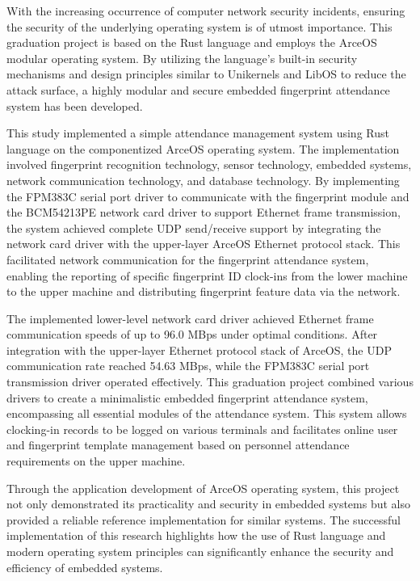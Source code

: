 \documentclass[UTF8,AutoFakeBold=1,AutoFakeSlant,zihao=-4]{scnuthesis}
\begin{document}
\begin{abstractEN}
    With the increasing occurrence of computer network security incidents, ensuring the security of the underlying operating system is of utmost importance. This graduation project is based on the Rust language and employs the ArceOS modular operating system. By utilizing the language's built-in security mechanisms and design principles similar to Unikernels and LibOS to reduce the attack surface, a highly modular and secure embedded fingerprint attendance system has been developed.

    This study implemented a simple attendance management system using Rust language on the componentized ArceOS operating system. The implementation involved fingerprint recognition technology, sensor technology, embedded systems, network communication technology, and database technology. By implementing the FPM383C serial port driver to communicate with the fingerprint module and the BCM54213PE network card driver to support Ethernet frame transmission, the system achieved complete UDP send/receive support by integrating the network card driver with the upper-layer ArceOS Ethernet protocol stack. This facilitated network communication for the fingerprint attendance system, enabling the reporting of specific fingerprint ID clock-ins from the lower machine to the upper machine and distributing fingerprint feature data via the network.

    The implemented lower-level network card driver achieved Ethernet frame communication speeds of up to 96.0 MBps under optimal conditions. After integration with the upper-layer Ethernet protocol stack of ArceOS, the UDP communication rate reached 54.63 MBps, while the FPM383C serial port transmission driver operated effectively. This graduation project combined various drivers to create a minimalistic embedded fingerprint attendance system, encompassing all essential modules of the attendance system. This system allows clocking-in records to be logged on various terminals and facilitates online user and fingerprint template management based on personnel attendance requirements on the upper machine.

    Through the application development of ArceOS operating system, this project not only demonstrated its practicality and security in embedded systems but also provided a reliable reference implementation for similar systems. The successful implementation of this research highlights how the use of Rust language and modern operating system principles can significantly enhance the security and efficiency of embedded systems.
\end{abstractEN}
\end{document}

